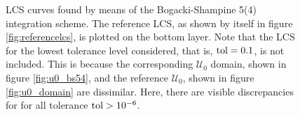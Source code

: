 \begin{figure}[htpb]
    \centering
    
    \caption[LCS curves found by means of the Bogacki-Shampine 5(4) integration
    scheme]{
        LCS curves found by means of the Bogacki-Shampine 5(4) integration
        scheme. The reference LCS, as shown by itself in figure
        \ref{fig:referencelcs}, is plotted on the bottom layer. Note that
        the LCS for the lowest tolerance level considered, that is,
        $\textnormal{tol}=0.1$, is not included. This is because the
        corresponding $\mathcal{U}_{0}$ domain, shown in figure
        \ref{fig:u0_bs54}, and the reference $\mathcal{U}_{0}$, shown in figure
        \ref{fig:u0_domain} are dissimilar. Here, there are visible
        discrepancies for for all tolerance $\textnormal{tol}>10^{-6}$.}
    \label{fig:lcs_rkbs54}
\end{figure}
